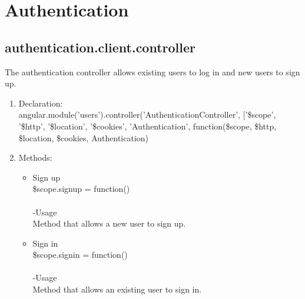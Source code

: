 \documentclass[a4paper,12pt]{report}
\begin{document}
\section{Authentication}
\subsection{authentication.client.controller}
The authentication controller allows existing users to log in and new users to sign up.
\begin{enumerate}
\item Declaration: \\angular.module('users').controller('AuthenticationController', ['\$scope', '\$http', '\$location', '\$cookies', 'Authentication',
	function(\$scope, \$http, \$location, \$cookies, Authentication)
\item Methods:
	\begin{itemize}
 	\item Sign up \\
	 \$scope.signup = function()\\  \\
 	-Usage\\
	 Method that allows a new user to sign up.
	 \item Sign in\\
  	\$scope.signin = function()\\ \\
	 -Usage\\
 	Method that allows an existing user to sign in.
 \end{itemize}	
\end{enumerate}
\end{document}

